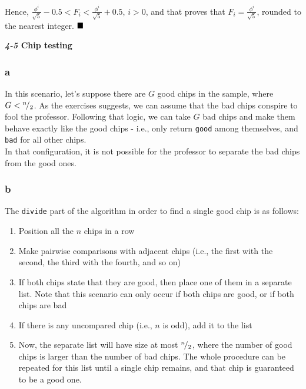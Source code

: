 \documentclass[8pt,a4paper]{article}
\begin{document}
  Hence, $\frac{\phi^{i}}{\sqrt{5}} - 0.5 < F_{i} < \frac{\phi^{i}}{\sqrt{5}} + 0.5$, $i > 0$,
and that proves that $F_{i} = \frac{\phi^{i}}{\sqrt{5}}$, rounded to the nearest integer. $\qed$

\newpage

\begin{framed}
\textbf{\textit{4-5} Chip testing}
\end{framed}

\subsubsection*{a}

  In this scenario, let's suppose there are $G$ good chips in the sample,
where $G < {}^{n}\!/_{2}$. As the exercises suggests, we can assume that the
bad chips conspire to fool the professor. Following that logic, we can take
$G$ bad chips and make them behave exactly like the good chips - i.e., only
return \texttt{good} among themselves, and \texttt{bad} for all other chips. \\

  In that configuration, it is not possible for the professor to separate
the bad chips from the good ones. \\

\subsubsection*{b}

  The \texttt{divide} part of the algorithm in order to find a single good
chip is as follows:

\begin{enumerate}
  \item Position all the $n$ chips in a row
  \item Make pairwise comparisons with adjacent chips (i.e., the first with
        the second, the third with the fourth, and so on)
  \item If both chips state that they are good, then place one of them in a
        separate list. Note that this scenario can only occur if both chips
        are good, or if both chips are bad
  \item If there is any uncompared chip (i.e., $n$ is odd), add it to the list
  \item Now, the separate list will have size at most ${}^{n}\!/_{2}$, where
        the number of good chips is larger than the number of bad chips. The
        whole procedure can be repeated for this list until a single chip
        remains, and that chip is guaranteed to be a good one.
\end{enumerate}
\end{document}
